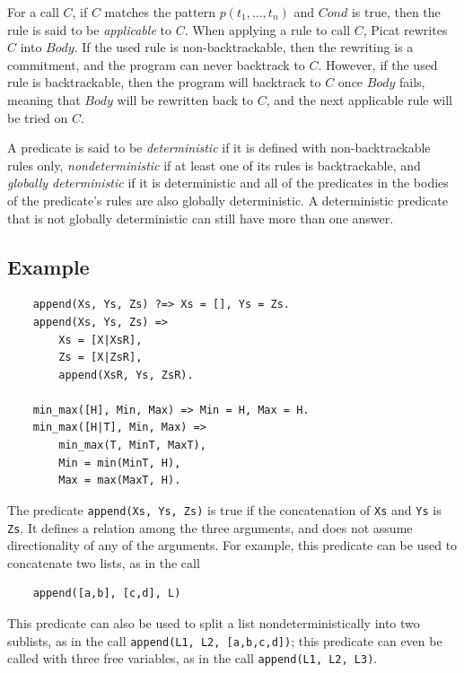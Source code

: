 For a call $C$, if $C$ matches the pattern $p(t_1, \ldots, t_n)$ and $Cond$ is true, then the rule is said to be \emph{applicable} to $C$. When applying a rule to call $C$, Picat rewrites $C$ into $Body$. If the used rule is non-backtrackable, then the rewriting is a commitment, and the program can never backtrack to $C$. However, if the used rule is backtrackable, then the program will backtrack to $C$ once $Body$ fails, meaning that $Body$ will be rewritten back to $C$, and the next applicable rule will be tried on $C$. 

A predicate is said to be \emph{deterministic} if it is defined with non-backtrackable rules only, \emph{nondeterministic} if at least one of its rules is backtrackable, and \emph{globally deterministic} if it is deterministic and all of the predicates in the bodies of the predicate's rules are also globally deterministic. A deterministic predicate that is not globally deterministic can still have more than one answer. 

\subsection*{Example}
\begin{verbatim}
    append(Xs, Ys, Zs) ?=> Xs = [], Ys = Zs.
    append(Xs, Ys, Zs) =>
        Xs = [X|XsR],
        Zs = [X|ZsR],
        append(XsR, Ys, ZsR).

    min_max([H], Min, Max) => Min = H, Max = H.
    min_max([H|T], Min, Max) => 
        min_max(T, MinT, MaxT), 
        Min = min(MinT, H),
        Max = max(MaxT, H).
\end{verbatim}
The predicate \texttt{append(Xs, Ys, Zs)} is true if the concatenation of \texttt{Xs} and \texttt{Ys} is \texttt{Zs}. It defines a relation among the three arguments, and does not assume directionality of any of the arguments. For example, this predicate can be used to concatenate two lists, as in the call 
\begin{verbatim}
    append([a,b], [c,d], L)
\end{verbatim}
This predicate can also be used to split a list nondeterministically into two sublists, as in the call \texttt{append(L1, L2, [a,b,c,d])}; this predicate can even be called with three free variables, as in the call \texttt{append(L1, L2, L3)}. 

